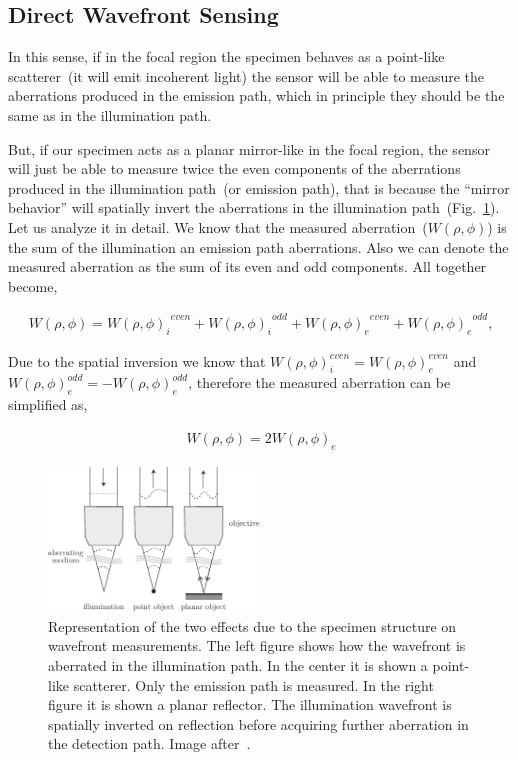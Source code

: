 \subsection{Direct Wavefront Sensing}

In this sense, if in the focal region the specimen behaves as a point-like scatterer~(it will emit incoherent light) the sensor will be able to measure the aberrations produced in the emission path, which in principle they should be the same as in the illumination path.

But, if our specimen acts as a planar mirror-like in the focal region, the sensor will just be able to measure twice the even components of the aberrations produced in the illumination path~(or emission path), that is because the "`mirror behavior"' will spatially invert the aberrations in the illumination path~(Fig.~\ref{fig:abe_direct_sensing}). Let us analyze it in detail. We know that the measured aberration~($W(\rho,\phi)$) is the sum of the illumination an emission path aberrations. Also we can denote the measured aberration as the sum of its even and odd components. All together become,  

\begin{align}
	\ W(\rho,\phi) = {{W(\rho,\phi)_i}^{even}} + {{W(\rho,\phi)_i}^{odd}}+{{W(\rho,\phi)_e}^{even}} + {{W(\rho,\phi)_e}^{odd}},
	\label{eq:aberration_sum_il_em}
\end{align}  

Due to the spatial inversion we know that $W(\rho,\phi)_i^{even}=W(\rho,\phi)_e^{even}$ and $W(\rho,\phi)_e^{odd}=-W(\rho,\phi)_e^{odd}$, therefore the measured aberration can be simplified as,  

\begin{align}
	\ W(\rho,\phi)=2 {{W(\rho,\phi)_e}}
	\label{eq:ab_measured_spat_inver}
\end{align} 
 

\begin{figure}[htbp]
	\centering
		\includegraphics[width=0.50\textwidth]{images/abe_direct_sensing}
	\caption{Representation of the two effects due to the specimen structure on wavefront measurements. The left figure shows how the wavefront is aberrated in the illumination path. In the center it is shown a point-like scatterer. Only the emission path is measured. In the right figure it is shown a planar reflector. The illumination wavefront is spatially inverted on reflection before acquiring further aberration in the detection path. Image after~\cite{AOM_basic_ref}.}
	\label{fig:abe_direct_sensing}
\end{figure}



